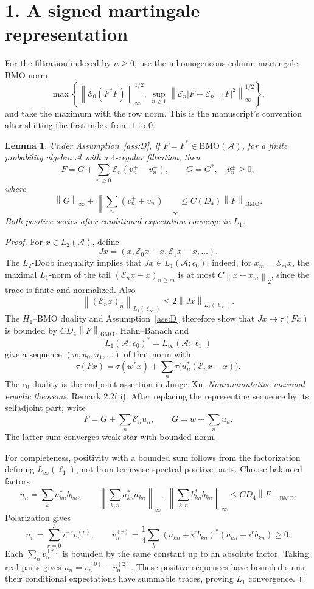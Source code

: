 \documentclass[11pt]{article}
\newtheorem{lemma}[theorem]{Lemma}
\newcommand{\A}{\mathcal A}
\newcommand{\BMO}{\mathrm{BMO}}
\newcommand{\norm}[1]{\left\|#1\right\|}
\begin{document}
\section*{1. A signed martingale representation}
For the filtration indexed by \(n\ge0\), use the inhomogeneous column
martingale BMO norm
\[
 \max\left\{
 \norm{\mathcal E_0(F^*F)}_\infty^{1/2},\,
 \sup_{n\ge1}\norm{\mathcal E_n
   |F-\mathcal E_{n-1}F|^2}_\infty^{1/2}\right\},
\]
and take the maximum with the row norm. This is the manuscript's
convention after shifting the first index from \(1\) to \(0\).
\begin{lemma}\label{lem:representation}
Under Assumption~\ref{ass:D}, if \(F=F^*\in\BMO(\A)\), for a finite
probability algebra \(\A\) with a \(4\)-regular filtration, then
\[
 F=G+\sum_{n\ge0}\mathcal E_n(v_n^+-v_n^-),
 \qquad G=G^*,\quad v_n^\pm\ge0,
\]
where
\[
 \norm{G}_\infty+
 \norm{\sum_n(v_n^++v_n^-)}_\infty
 \le C(D_4)\norm{F}_{\BMO}.
\]
Both positive series after conditional expectation converge in \(L_1\).
\end{lemma}

\begin{proof}
For \(x\in L_2(\A)\), define
\[
 Jx=(x,\mathcal E_0x-x,\mathcal E_1x-x,\ldots).
\]
The \(L_2\)-Doob inequality implies that \(Jx\in L_1(\A;c_0)\):
indeed, for \(x_m=\mathcal E_mx\), the maximal \(L_1\)-norm of the tail
\((\mathcal E_nx-x)_{n\ge m}\) is at most
\(C\norm{x-x_m}_2\), since the trace is finite and normalized.
Also
\[
 \norm{(\mathcal E_nx)_n}_{L_1(\ell_\infty)}
 \le2\norm{Jx}_{L_1(\ell_\infty)}.
\]
The \(H_1\)--BMO duality and Assumption~\ref{ass:D} therefore show that
\(Jx\mapsto\tau(Fx)\) is bounded by
\(C D_4\norm{F}_{\BMO}\).
Hahn--Banach and
\[
 L_1(\A;c_0)^*=L_\infty(\A;\ell_1)
\]
give a sequence \((w,u_0,u_1,\ldots)\) of that norm with
\[
 \tau(Fx)=\tau(w^*x)
       +\sum_n\tau\bigl(u_n^*(\mathcal E_nx-x)\bigr).
\]
The \(c_0\) duality is the endpoint assertion in Junge--Xu,
\emph{Noncommutative maximal ergodic theorems}, Remark 2.2(ii).
After replacing the representing sequence by its selfadjoint part, write
\[
 F=G+\sum_n\mathcal E_nu_n,\qquad
 G=w-\sum_nu_n.
\]
The latter sum converges weak-star with bounded norm.

For completeness, positivity with a bounded sum follows from the
factorization defining \(L_\infty(\ell_1)\), not from termwise spectral
positive parts. Choose balanced factors
\[
 u_n=\sum_k a_{kn}^*b_{kn},\qquad
 \norm{\sum_{k,n}a_{kn}^*a_{kn}}_\infty,\
 \norm{\sum_{k,n}b_{kn}^*b_{kn}}_\infty\le C D_4\norm{F}_{\BMO}.
\]
Polarization gives
\[
 u_n=\sum_{r=0}^3i^{-r}v_n^{(r)},\qquad
 v_n^{(r)}=\frac14\sum_k
 (a_{kn}+i^rb_{kn})^*(a_{kn}+i^rb_{kn})\ge0.
\]
Each \(\sum_n v_n^{(r)}\) is bounded by the same constant up to an
absolute factor. Taking real parts gives \(u_n=v_n^{(0)}-v_n^{(2)}\).
These positive sequences have bounded sums; their conditional
expectations have summable traces, proving \(L_1\) convergence.
\end{proof}
\end{document}
